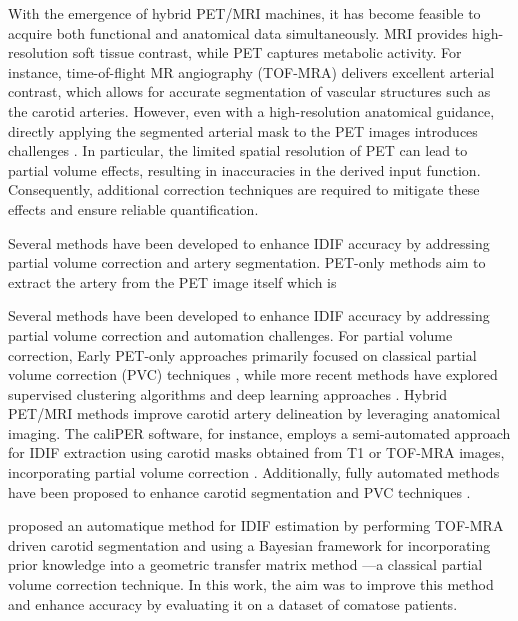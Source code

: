 With the emergence of hybrid PET/MRI machines, it has become feasible to acquire both functional and anatomical data simultaneously.
MRI provides high-resolution soft tissue contrast, while PET captures metabolic activity.
For instance, time-of-flight MR angiography (TOF-MRA) delivers excellent arterial contrast, which allows for accurate segmentation of vascular structures such as the carotid arteries.
However, even with a high-resolution anatomical guidance, directly applying the segmented arterial mask to the PET images introduces challenges \cite{zanotti2011image}.
In particular, the limited spatial resolution of PET can lead to partial volume effects, resulting in inaccuracies in the derived input function.
Consequently, additional correction techniques are required to mitigate these effects and ensure reliable quantification.

Several methods have been developed to enhance IDIF accuracy by addressing partial volume correction and artery segmentation.
PET-only methods aim to extract the artery from the PET image itself which is


Several methods have been developed to enhance IDIF accuracy by addressing partial volume correction and automation challenges.
For partial volume correction,
Early PET-only approaches primarily focused on classical partial volume correction (PVC) techniques \cite{mourik2009image}, while more recent methods have explored supervised clustering algorithms \cite{lyoo2014image} and deep learning approaches \cite{chavan2024end,ferrante2024physically}.
Hybrid PET/MRI methods improve carotid artery delineation by leveraging anatomical imaging. The caliPER software, for instance, employs a semi-automated approach for IDIF extraction using carotid masks obtained from T1 or TOF-MRA images, incorporating partial volume correction \cite{dassanayake2022caliper}.
Additionally, fully automated methods have been proposed to enhance carotid segmentation and PVC techniques \cite{sari2017estimation, jochimsen2016fully, khalighi2018image, sundar2019towards}.

\citeauthor{irace2021bayesian} \cite{irace2021bayesian} proposed an automatique method for IDIF estimation by performing TOF-MRA driven carotid segmentation and using a Bayesian framework for incorporating prior knowledge into a geometric transfer matrix method \cite{rousset1998correction}---a classical partial volume correction technique.
In this work, the aim was to improve this method and enhance accuracy by evaluating it on a dataset of comatose patients.
